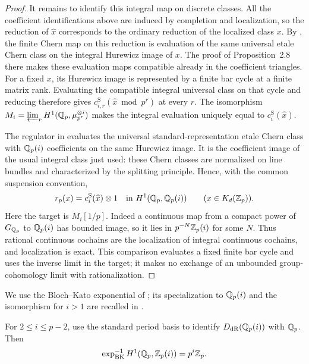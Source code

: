 \begin{proof}
It remains to identify this integral map on discrete classes.
All the coefficient identifications above are induced by completion
and localization, so the reduction of $\widehat x$ corresponds to the
ordinary reduction of the localized class $x$.
By \cite[Lemma~2.3]{WeibelEtaleChern}, the finite Chern map on this
reduction is evaluation of the same universal etale Chern class on
the integral Hurewicz image of $x$.  The proof of Proposition~2.8
there makes these evaluation maps compatible already in the
coefficient triangles.  For a fixed $x$, its Hurewicz image is
represented by a finite bar cycle at a finite matrix rank.  Evaluating
the compatible integral universal class on that cycle and reducing
therefore gives $c_{i,r}^{\mathrm S}(\widehat x\bmod p^r)$ at every
$r$.  The isomorphism $M_i=\varprojlim_r H^1(\mathbb Q_p,\mu_{p^r}^{\otimes i})$
makes the integral evaluation uniquely equal to
$c_i^{\mathrm S}(\widehat x)$.

The regulator in \cite[Section~1.3]{HuberKings} evaluates the
universal standard-representation etale Chern class with $\mathbb Q_p(i)$
coefficients on the same Hurewicz image.  It is the coefficient image
of the usual integral class just used: these Chern classes are
normalized on line bundles and characterized by the splitting
principle.  Hence, with the common suspension convention,
\[
 r_p(x)=c_i^{\mathrm S}(\widehat x)\otimes1
 \quad\text{in }H^1(\mathbb Q_p,\mathbb Q_p(i))
 \qquad (x\in K_d(\mathbb Z_p)).
\]
Here the target is $M_i[1/p]$.  Indeed a continuous map from a compact
power of $G_{\mathbb Q_p}$ to $\mathbb Q_p(i)$ has bounded image, so it lies in
$p^{-N}\mathbb Z_p(i)$ for some $N$.  Thus rational continuous cochains are
the localization of integral continuous cochains, and localization is
exact.  This comparison evaluates a fixed finite bar cycle and uses
the inverse limit in the target; it makes no exchange of an unbounded
group-cohomology limit with rationalization.
\end{proof}

We use the Bloch--Kato exponential of
\cite[Definition~3.10 and Proposition~1.17]{BlochKatoTamagawa};
its specialization to $\mathbb Q_p(i)$ and the isomorphism for $i>1$
are recalled in \cite[Section~1.3]{HuberKings}.

\begin{lemma}
\label{gen:exponential-lattice}
For $2\leq i\leq p-2$, use the standard period basis to identify
$D_{\mathrm{dR}}(\mathbb Q_p(i))$ with $\mathbb Q_p$.  Then
\[
 \exp_{\mathrm{BK}}^{-1}
     H^1(\mathbb Q_p,\mathbb Z_p(i))=p^i\mathbb Z_p.
\]
\end{lemma}

